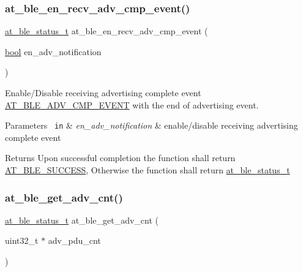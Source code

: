\subsubsection{\texorpdfstring{at\_ble\_en\_recv\_adv\_cmp\_event()}{at\_ble\_en\_recv\_adv\_cmp\_event()}}
{\footnotesize\ttfamily \mbox{\hyperlink{group__error__codes__group_ga3b1db9b95feb157b3c188ca27fe76988}{at\+\_\+ble\+\_\+status\+\_\+t}} at\+\_\+ble\+\_\+en\+\_\+recv\+\_\+adv\+\_\+cmp\+\_\+event (\begin{DoxyParamCaption}\item[{\mbox{\hyperlink{group__group__sam0__utils_ga97a80ca1602ebf2303258971a2c938e2}{bool}}}]{en\+\_\+adv\+\_\+notification }\end{DoxyParamCaption})}



Enable/\+Disable receiving advertising complete event \mbox{\hyperlink{at__ble__api_8h_a3324640b95f33169515f89738ed5baebac6e92e8f99a08c49a27007c2e32124f9}{A\+T\+\_\+\+B\+L\+E\+\_\+\+A\+D\+V\+\_\+\+C\+M\+P\+\_\+\+E\+V\+E\+NT}} with the end of advertising event. 


\begin{DoxyParams}[1]{Parameters}
\mbox{\texttt{ in}}  & {\em en\+\_\+adv\+\_\+notification} & enable/disable receiving advertising complete event\\
\hline
\end{DoxyParams}
\begin{DoxyReturn}{Returns}
Upon successful completion the function shall return \mbox{\hyperlink{group__error__codes__group_gga3b1db9b95feb157b3c188ca27fe76988a7e3bfff5387331cd4f2c56cbcbbd7e19}{A\+T\+\_\+\+B\+L\+E\+\_\+\+S\+U\+C\+C\+E\+SS}}, Otherwise the function shall return \mbox{\hyperlink{at__ble__api_8h_ace24eb4e5ca3f325c663b809da5feb92}{at\+\_\+ble\+\_\+status\+\_\+t}} 
\end{DoxyReturn}
\mbox{\label{group__gap__adv__group_ga989a6f7ad4b5ec22583a2c4f13afc925}} 
\subsubsection{\texorpdfstring{at\_ble\_get\_adv\_cnt()}{at\_ble\_get\_adv\_cnt()}}
{\footnotesize\ttfamily \mbox{\hyperlink{group__error__codes__group_ga3b1db9b95feb157b3c188ca27fe76988}{at\+\_\+ble\+\_\+status\+\_\+t}} at\+\_\+ble\+\_\+get\+\_\+adv\+\_\+cnt (\begin{DoxyParamCaption}\item[{uint32\+\_\+t $\ast$}]{adv\+\_\+pdu\+\_\+cnt }\end{DoxyParamCaption})}



